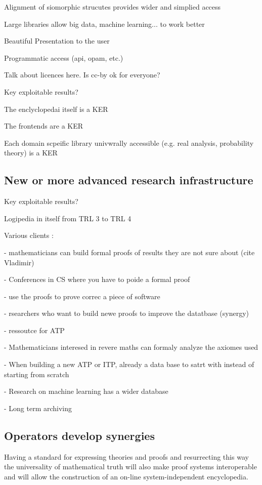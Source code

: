 Alignment of siomorphic strucutes provides wider and simplied access

Large libraries allow big data, machine learning... to work better

Beautiful Presentation to the user

Programmatic access (api, opam, etc.)

{\color{red} Talk about licences here. Is cc-by ok for everyone?}

{\color{red} Key exploitable results?}

The enclyclopedai itself is a KER

The frontends are a KER

Each domain scpeific library univwrally accessible (e.g. real analysis, probability theory) is a KER


\subsection{New or more advanced research infrastructure}

{\color{red} Key exploitable results?}

Logipedia in itself from TRL 3 to TRL 4

Various clients :

- mathematicians can build formal proofs of results they are not sure about
(cite Vladimir)

- Conferences in CS where you have to poide a formal proof

- use the proofs to prove correc a piece of software

- rsearchers who want to build newe proofs to improve the datatbase (synergy)

- ressoutce for ATP

- Mathematicians interesed in revere maths can formaly analyze the axiomes used

- When building a new ATP or ITP, already a data base to satrt with
instead of starting from scratch

- Research on machine learning has a wider database

- Long term archiving


\subsection{Operators develop synergies}

Having a standard for expressing theories and proofs and resurrecting
this way the universality of mathematical truth will also make proof
systems interoperable and will allow the construction of an on-line
system-independent encyclopedia.

